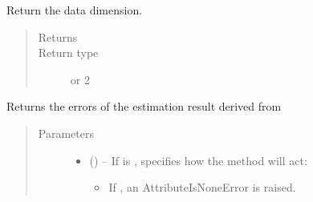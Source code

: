 \documentclass[letterpaper,10pt,english]{sphinxmanual}
\begin{document}
\begin{fulllineitems}
\begin{fulllineitems}
\begin{quote}
\begin{description}
\end{description}\end{quote}

\end{fulllineitems}


\begin{fulllineitems}
\label{\detokenize{references/core:nmrespy.core.Estimator.get_dim}}
\sphinxAtStartPar
Return the data dimension.
\begin{quote}\begin{description}
\item[{Returns}] \leavevmode
\sphinxAtStartPar
{}

\item[{Return type}] \leavevmode
{} or 2

\end{description}\end{quote}

\end{fulllineitems}


\begin{fulllineitems}
\label{\detokenize{references/core:nmrespy.core.Estimator.get_errors}}
\sphinxAtStartPar
Returns the errors of the estimation result derived from
{\hyperref[\detokenize{references/core:nmrespy.core.Estimator.nonlinear_programming}]{}}
\begin{quote}\begin{description}
\item[{Parameters}] \leavevmode\begin{itemize}
\item {} 
\sphinxAtStartPar
{} (\sphinxstyleliteralemphasis{\sphinxupquote{, }}) – 
\sphinxAtStartPar
If  is ,  specifies how the method will
act:
\begin{itemize}
\item {} 
\sphinxAtStartPar
If , an AttributeIsNoneError is raised.


\end{itemize}
\end{itemize}
\end{description}
\end{quote}
\end{fulllineitems}
\end{fulllineitems}
\end{document}
